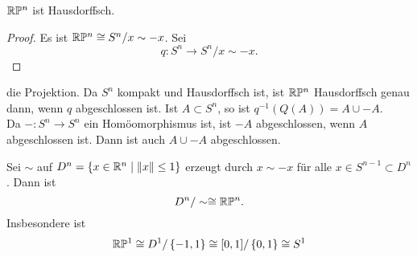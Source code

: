 \begin{example}
    $\mathbb{R} \mathbb{P}^n$ ist Hausdorffsch. 
    \begin{proof}
        Es ist $\mathbb{R} \mathbb{P}^n \cong S^n / x \sim  - x$. Sei
        \[
        q : S^n \to  S^n / x\sim -x
        .\] 
    \end{proof}
    die Projektion. Da $S^n$ kompakt und Hausdorffsch ist, ist  $\mathbb{R} \mathbb{P}^n$ Hausdorffsch genau dann, wenn $q$ abgeschlossen ist. Ist  $A\subset S^n$, so ist $q^{-1}(Q(A)) = A \cup -A$. \\
Da $-: S^n \to  S^n$ ein Homöomorphismus ist, ist $-A$ abgeschlossen, wenn  $A$ abgeschlossen ist. Dann ist auch  $A \cup -A$ abgeschlossen.
\end{example}
\begin{corollary*}\label{cor:reeller-projektiver-raum-ist-quotientenraum-von-dn}
    Sei $\sim $ auf $D^n = \left \{x \in \mathbb{R}^n \mid  \lVert x \rVert \leq 1\right\} $ erzeugt durch $x \sim -x$ für alle $x\in S^{n-1}\subset D^n$. Dann ist
    \[
    D^n / \sim  \cong \mathbb{R} \mathbb{P}^n
    .\] 
    Insbesondere ist 
    \[
        \mathbb{R}\mathbb{P}^1 \cong D^1 / \left \{-1,1\right\} \cong [0,1] / \left \{0,1\right\}  \cong S^1
    \]
    \label{cor:}
\end{corollary*}

